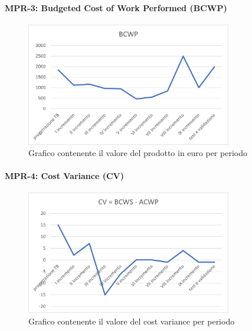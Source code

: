 \paragraph{MPR-3: Budgeted Cost of Work Performed (BCWP)}\label{_BCWP}
\begin{figure}[!htb]
    \centering
    \includegraphics[width=0.8\textwidth]{res/images/metriche_costi/BCWP.png}
    \caption{Grafico contenente il valore del prodotto in euro per periodo}
\end{figure}


\paragraph{MPR-4: Cost Variance (CV)}\label{_CV}
\begin{figure}[!htb]
    \centering
    \includegraphics[width=0.8\textwidth]{res/images/metriche_costi/CV.png}
    \caption{Grafico contenente il valore del cost variance per periodo}
\end{figure}
\newpage
